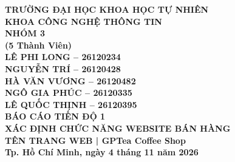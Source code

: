 \documentclass[a4paper,12pt]{report}
\numberwithin{equation}{chapter}
\newcommand{\chuongkhongso}[1]{\clearpage\phantomsection\chapter*{#1}\addcontentsline{toc}{chapter}{#1}}
\newcommand{\chuongkhongmucluc}[1]{\clearpage\phantomsection\chapter*{#1}}
\begin{document}
\begin{titlepage}
\centering
\bfseries
{\large TRƯỜNG ĐẠI HỌC KHOA HỌC TỰ NHIÊN\\[2pt]
KHOA CÔNG NGHỆ THÔNG TIN}\\[2.5cm]
{\large NHÓM 3}\\[0.5cm]
{\large (5 Thành Viên)}\\[4pt]
{\large LÊ PHI LONG -- 26120234\\[4pt]
NGUYỄN TRÍ -- 26120428\\[4pt]
HÀ VĂN VƯƠNG -- 26120482\\[4pt]
NGÔ GIA PHÚC -- 26120335\\[4pt]
LÊ QUỐC THỊNH -- 26120395}\\[2cm]
{\Large BÁO CÁO TIẾN ĐỘ 1\\[8pt]
XÁC ĐỊNH CHỨC NĂNG WEBSITE BÁN HÀNG \\[4pt]
TÊN TRANG WEB | GPTea Coffee Shop}\\[2.5cm]  %
\vfill
{\large Tp. Hồ Chí Minh, ngày 4 tháng 11 năm 2026}  %
\end{titlepage}

\setcounter{page}{1}






\end{document}
